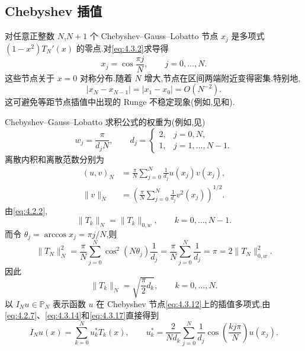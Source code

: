 \subsection{Chebyshev 插值}\label{sec:4.3.2}

对任意正整数 \(N\),\(N+1\) 个 Chebyshev--Gauss--Lobatto 节点 \(x_j\) 是多项式 \((1-x^2)T_N'(x)\) 的零点.对\eqref{eq:4.3.2}求导得
\begin{equation}\label{eq:4.3.12}
  x_j=\cos\frac{\pi j}{N},\qquad j=0,\ldots,N.
\end{equation}
这些节点关于 \(x=0\) 对称分布.随着 \(N\) 增大,节点在区间两端附近变得密集.特别地,
\[
  |x_N-x_{N-1}|=|x_1-x_0|=O(N^{-2}).
\]
这可避免等距节点插值中出现的 Runge 不稳定现象(例如,见和).

Chebyshev--Gauss--Lobatto 求积公式的权重为(例如,见)
\begin{equation}\label{eq:4.3.13}
  w_j=\frac{\pi}{d_jN},\qquad
  d_j=\begin{cases}
    2,&j=0,N,\\
    1,&j=1,\ldots,N-1.
  \end{cases}
\end{equation}
离散内积和离散范数分别为
\begin{equation}\label{eq:4.3.14}
  \begin{aligned}
    (u,v)_N&=\frac\pi N\sum_{j=0}^N\frac{1}{d_j}u(x_j)v(x_j),\\
    \|v\|_N&=\left(\frac\pi N\sum_{j=0}^N\frac{1}{d_j}v^2(x_j)\right)^{1/2}.
  \end{aligned}
\end{equation}
由\eqref{eq:4.2.2},
\begin{equation}\label{eq:4.3.15}
  \|T_k\|_N=\|T_k\|_{0,w},\qquad k=0,\ldots,N-1.
\end{equation}
而令 \(\theta_j=\arccos x_j=\pi j/N\),则
\begin{equation}\label{eq:4.3.16}
  \|T_N\|_N^2=\frac\pi N\sum_{j=0}^N\cos^2(N\theta_j)\frac{1}{d_j}
    =\frac\pi N\sum_{j=0}^N\frac{1}{d_j}=\pi=2\|T_N\|_{0,w}^2.
\end{equation}
因此
\begin{equation}\label{eq:4.3.17}
  \|T_k\|_N=\sqrt{\frac\pi2d_k},\qquad k=0,\ldots,N.
\end{equation}
以 \(I_Nu\in\mathbb P_N\) 表示函数 \(u\) 在 Chebyshev 节点\eqref{eq:4.3.12}上的插值多项式,由\eqref{eq:4.2.7}、\eqref{eq:4.3.14}和\eqref{eq:4.3.17}直接得到
\begin{equation}\label{eq:4.3.18}
  I_Nu(x)=\sum_{k=0}^N u_k^*T_k(x),\qquad
  u_k^*=\frac{2}{Nd_k}\sum_{j=0}^N\frac{1}{d_j}
    \cos\left(\frac{kj\pi}{N}\right)u(x_j).
\end{equation}

